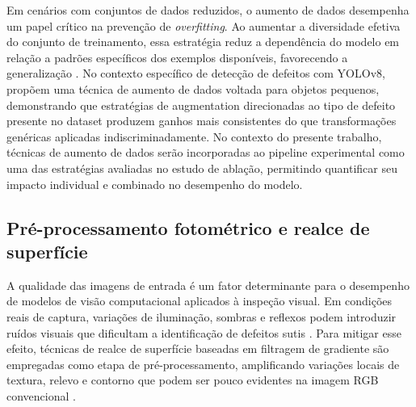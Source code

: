 \documentclass[
    12pt,                %
    openright,           %
    oneside,             %
    a4paper,             %
    english,             %
    brazil               %
]{abntex2}
\begin{document}
Em cenários com conjuntos de dados reduzidos, o aumento
de dados desempenha um papel crítico na prevenção de
\textit{overfitting}. Ao aumentar a diversidade efetiva do
conjunto de treinamento, essa estratégia reduz a dependência
do modelo em relação a padrões específicos dos exemplos
disponíveis, favorecendo a generalização \cite{Chen2021}.
No contexto específico de detecção de defeitos com YOLOv8, 
 propõem uma técnica de aumento de 
dados voltada para objetos pequenos, demonstrando que 
estratégias de augmentation direcionadas ao tipo de defeito 
presente no dataset produzem ganhos mais consistentes do que 
transformações genéricas aplicadas indiscriminadamente.
No contexto do presente trabalho, técnicas de aumento de
dados serão incorporadas ao pipeline experimental como
uma das estratégias avaliadas no estudo de ablação,
permitindo quantificar seu impacto individual e combinado no desempenho
do modelo.

\subsection{Pré-processamento fotométrico e realce de superfície}
\label{subsec:fotometria}

A qualidade das imagens de entrada é um fator determinante para o 
desempenho de modelos de visão computacional aplicados à inspeção 
visual. Em condições reais de captura, variações de iluminação, 
sombras e reflexos podem introduzir ruídos visuais que dificultam 
a identificação de defeitos sutis \cite{Zheng2021}. Para mitigar 
esse efeito, técnicas de realce de superfície baseadas em filtragem 
de gradiente são empregadas como etapa de pré-processamento, 
amplificando variações locais de textura, relevo e contorno que 
podem ser pouco evidentes na imagem RGB convencional \cite{Chen2021}.
\end{document}
